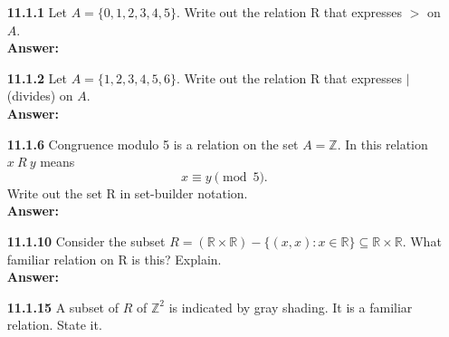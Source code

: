 \documentclass[11pt]{report}
\theoremstyle{plain}
\newcommand{\Z}{\mathbb{Z}}
\newcommand{\R}{\mathbb{R}}
\begin{document}
\begin{enumerate}
\item[\textbf{11.1.1}] Let $A = \{0,1,2,3,4,5\}.$ Write out the relation R that expresses $>$ on $A$.\\
\textbf{Answer:} \\
\vspace{0.5in}
\item[\textbf{11.1.2}] Let $A =\{1,2,3,4,5,6\}.$  Write out the relation R that expresses $\mid$ (divides) on $A.$\\
\textbf{Answer:} \\
\vspace{0.5in}
\item[\textbf{11.1.6}] Congruence modulo 5 is a relation on the set $A =\Z.$ In this relation $x \:R\: y$ means $$x \equiv y \pmod 5.$$ Write out the set R in set-builder notation.\\
\textbf{Answer:} \\
\vspace{0.5in}
\item[\textbf{11.1.10}] Consider the subset $R = (\R \times \R)-\{(x, x) : x \in \R\} \subseteq \R \times \R.$ What familiar relation on R is this? Explain.\\
\textbf{Answer:} \\
\vspace{0.5in}
\item[\textbf{11.1.15}] A subset of $R$ of $\Z^2$ is indicated by gray shading. It is a familiar relation. State it.\\


\\


\end{enumerate}
\end{document}
